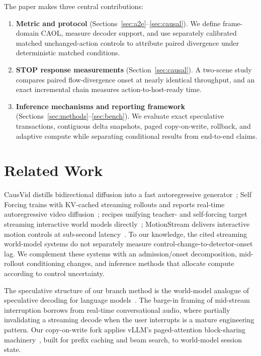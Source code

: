 \documentclass[11pt]{article}
\newcommand{\caol}{CAOL}
\begin{document}
The paper makes three central contributions:
\begin{enumerate}
\item \textbf{Metric and protocol} (Sections~\ref{sec:a2e}--\ref{sec:causal}). We define frame-domain \caol{}, measure decoder support, and use separately calibrated matched unchanged-action controls to attribute paired divergence under deterministic matched conditions.
\item \textbf{STOP response measurements} (Section~\ref{sec:causal}). A two-scene study compares paired flow-divergence onset at nearly identical throughput, and an exact incremental chain measures action-to-host-ready time.
\item \textbf{Inference mechanisms and reporting framework} (Sections~\ref{sec:methods}--\ref{sec:bench}). We evaluate exact speculative transactions, contiguous delta snapshots, paged copy-on-write, rollback, and adaptive compute while separating conditional results from end-to-end claims.
\end{enumerate}

\section{Related Work}
\label{sec:related}

CausVid distills bidirectional diffusion into a fast autoregressive generator~\cite{causvid}; Self Forcing trains with KV-cached streaming rollouts and reports real-time autoregressive video diffusion~\cite{selfforcing}; recipes unifying teacher- and self-forcing target streaming interactive world models directly~\cite{causalrcm}; MotionStream delivers interactive motion controls at sub-second latency~\cite{motionstream}. To our knowledge, the cited streaming world-model systems do not separately measure control-change-to-detector-onset lag. We complement these systems with an admission/onset decomposition, mid-rollout conditioning changes, and inference methods that allocate compute according to control uncertainty.

The speculative structure of our branch method is the world-model analogue of speculative decoding for language models~\cite{specdecode}. The barge-in framing of mid-stream interruption borrows from real-time conversational audio, where partially invalidating a streaming decode when the user interrupts is a mature engineering pattern. Our copy-on-write fork applies vLLM's paged-attention block-sharing machinery~\cite{pagedattention}, built for prefix caching and beam search, to world-model session state.
\end{document}

